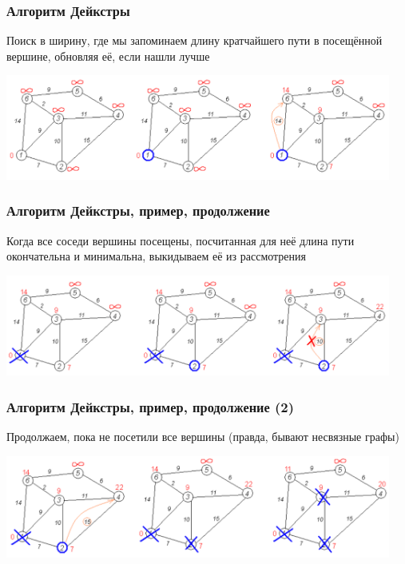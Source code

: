 \documentclass{../../slides-style}
\begin{document}
\begin{frame}
\begin{columns}
\begin{column}{0.35\textwidth}
\begin{center}
                \end{center}
            \end{column}
        \end{columns}
    \end{frame}

    \begin{frame}
        \frametitle{Алгоритм Дейкстры}
        Поиск в ширину, где мы запоминаем длину кратчайшего пути в посещённой вершине, обновляя её, если нашли лучше
        \begin{center}
            \includegraphics[width=0.95\textwidth]{dijkstra1.png}
        \end{center}
    \end{frame}

    \begin{frame}
        \frametitle{Алгоритм Дейкстры, пример, продолжение}
        Когда все соседи вершины посещены, посчитанная для неё длина пути окончательна и минимальна, выкидываем её из рассмотрения
        \begin{center}
            \includegraphics[width=0.95\textwidth]{dijkstra2.png}
        \end{center}
    \end{frame}

    \begin{frame}
        \frametitle{Алгоритм Дейкстры, пример, продолжение (2)}
        Продолжаем, пока не посетили все вершины (правда, бывают несвязные графы)
        \begin{center}
            \includegraphics[width=0.95\textwidth]{dijkstra3.png}
        \end{center}
    \end{frame}
\end{document}
